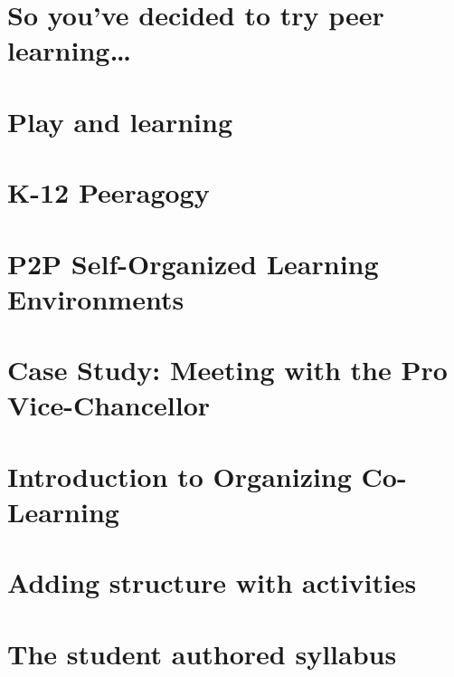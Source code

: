 \documentclass[nols,nobib]{tufte-book}
\begin{document}

%
\chapter[\textbf{So you've decided to try peer learning\ldots}]{So you've decided to try peer learning\ldots}

%
\chapter[\textbf{Play and learning}]{Play and learning}
%

%
\chapter[\textbf{K-12 Peeragogy}]{K-12 Peeragogy}
%

%
\chapter[\textbf{P2P SOLE}]{P2P Self-Organized Learning Environments}
%

%
\chapter[\textbf{Case Study: Meeting with the PVC}]{ Case Study: Meeting with the Pro Vice-Chancellor}
%



%
\chapter[\textbf{Organizing Co-Learning}]{Introduction to Organizing Co-Learning}

%
\chapter[\textbf{Adding structure}]{Adding structure with activities}
%

%
\chapter[\textbf{The student authored syllabus}]{ The student authored syllabus } 
%

%
\end{document}
